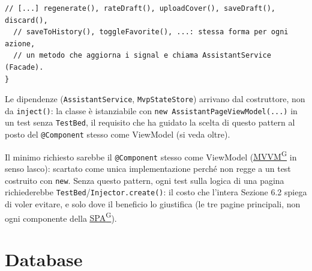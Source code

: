 \documentclass[a4paper,12pt]{article}
\providecommand{\glslink}[2]{\href{https://alittlebyte-19.github.io/Documentazione/glossario.html\#gls-#1}{\underline{#2}\textsuperscript{\scriptsize G}}}
\begin{document}
\begin{sloppypar}
\begin{lstlisting}[style=tslisting, caption={AssistantPageViewModel -- classe pura costruita con new(), niente inject() né riferimenti al DOM}]
  // [...] regenerate(), rateDraft(), uploadCover(), saveDraft(), discard(),
  // saveToHistory(), toggleFavorite(), ...: stessa forma per ogni azione,
  // un metodo che aggiorna i signal e chiama AssistantService (Facade).
}
\end{lstlisting}

Le dipendenze (\texttt{AssistantService}, \texttt{MvpStateStore}) arrivano dal costruttore, non da \texttt{inject()}: la classe è istanziabile con \texttt{new AssistantPageViewModel(...)} in un test senza \texttt{TestBed}, il requisito che ha guidato la scelta di questo pattern al posto del \texttt{@Component} stesso come ViewModel (si veda oltre).

Il minimo richiesto sarebbe il \texttt{@Component} stesso come ViewModel (\glslink{mvvm-model-view-viewmodel}{MVVM} in senso lasco): scartato come unica implementazione perché non regge a un test costruito con \texttt{new}. Senza questo pattern, ogni test sulla logica di una pagina richiederebbe \texttt{TestBed}/\texttt{Injector.create()}: il costo che l'intera Sezione 6.2 spiega di voler evitare, e solo dove il beneficio lo giustifica (le tre pagine principali, non ogni componente della \glslink{spa-single-page-application}{SPA}).

\end{sloppypar}

\section{Database}
\end{document}

